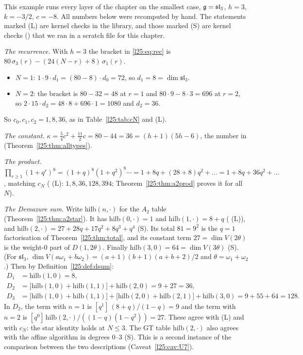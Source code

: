 \begin{example}\label{l25:ex:a2}
This example runs every layer of the chapter on the smallest case, $\mathfrak g=\mathfrak{sl}_3$, $h=3$, $k=-3/2$,
$c=-8$. All numbers below were recomputed by hand. The statements marked (L) are kernel checks in the library, and
those marked (S) are kernel checks () that we ran in a scratch file for this chapter.

\emph{The recurrence.} With $h=3$ the bracket in \eqref{l25:eq:rec} is $80\,\sigma_3(r)-(24(N-r)+8)\,\sigma_1(r)$.
\begin{itemize}
\item $N=1$: $1\cdot9\cdot d_1=(80-8)\cdot d_0=72$, so $d_1=8=\dim\mathfrak{sl}_3$.
\item $N=2$: the bracket is $80-32=48$ at $r=1$ and $80\cdot9-8\cdot3=696$ at $r=2$, so $2\cdot15\cdot d_2=48\cdot8+696\cdot1=1080$
  and $d_2=36$.
\end{itemize}
So $c_0,c_1,c_2=1,8,36$, as in Table~\ref{l25:tab:cN} and  (L).

\emph{The constant.} $\kappa=\frac54c^2+\frac{11}2c=80-44=36=(h+1)(5h-6)$, the number in 
(Theorem~\ref{l25:thm:alltypes}).

\emph{The product.} $\prod_{r\ge1}(1+q^r)^8=(1+q)^8(1+q^2)^8\cdots=1+8q+(28+8)q^2+\dots=1+8q+36q^2+\dots$, matching
$c_N$ ( (L): $1,8,36,128,394$; Theorem~\ref{l25:thm:a2prod} proves it for all $N$).

\emph{The Demazure sum.} Write $\mathrm{hilb}(n,\cdot)$ for the $A_2$ table (Theorem~\ref{l25:thm:a2star}). It has
$\mathrm{hilb}(0,\cdot)=1$ and $\mathrm{hilb}(1,\cdot)=8+q$ ( (L)), and
$\mathrm{hilb}(2,\cdot)=27+28q+17q^2+8q^3+q^4$ (S). Its total $81=9^2$ is the $q=1$ factorisation of
Theorem~\ref{l25:thm:total}, and its constant term $27=\dim V(2\theta)$ is the weight-$0$ part of $D(1,2\theta)$.
Finally $\mathrm{hilb}(3,0)=64=\dim V(3\theta)$ (S). (For $\mathfrak{sl}_3$, $\dim V(a\omega_1+b\omega_2)=(a+1)(b+1)(a+b+2)/2$
and $\theta=\omega_1+\omega_2$.) Then by Definition~\ref{l25:def:dsum}:
\begin{align*}
D_1&=\mathrm{hilb}(1,0)=8,\\
D_2&=\big[\mathrm{hilb}(1,0)+\mathrm{hilb}(1,1)\big]+\mathrm{hilb}(2,0)=9+27=36,\\
D_3&=\big[\mathrm{hilb}(1,0)+\mathrm{hilb}(1,1)\big]+\big[\mathrm{hilb}(2,0)+\mathrm{hilb}(2,1)\big]+\mathrm{hilb}(3,0)=9+55+64=128 .
\end{align*}
In $D_2$, the term with $n=1$ is $[q^1]\,(8+q)/(1-q)=9$ and the term with $n=2$ is $[q^0]\,\mathrm{hilb}(2,\cdot)/((1-q)(1-q^2))=27$.
These agree with  (L) and with $c_N$: the star identity holds at $N\le3$. The GT table
$\mathrm{hilb}(2,\cdot)$ also agrees with the affine algorithm  in
degrees $0$--$3$ (S). This is a second instance of the comparison between the two descriptions (Caveat~\ref{l25:cav:U7}).


\end{example}
